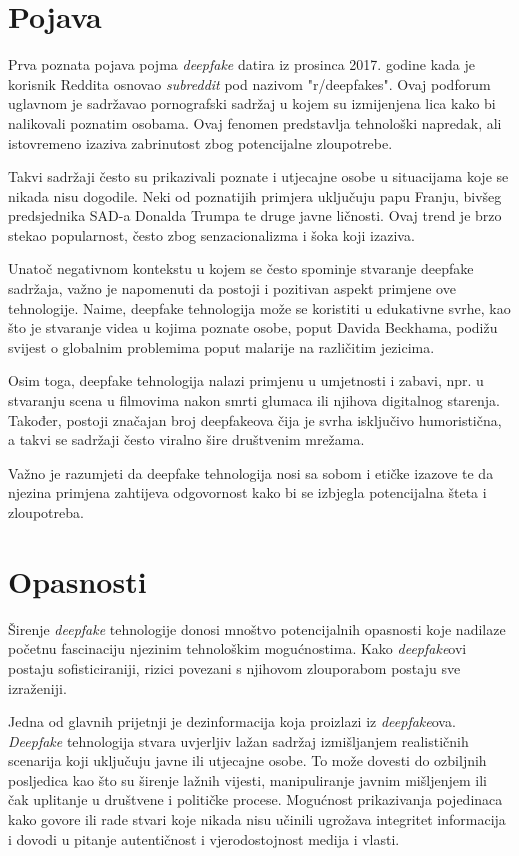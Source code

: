 \documentclass[seminarski, times, utf8]{fer}
\begin{document}
\section{Pojava}

Prva poznata pojava pojma \textit{deepfake} datira iz prosinca 2017. godine kada je korisnik Reddita osnovao \textit{subreddit} pod nazivom "r/deepfakes".\cite{britannica_deepfake}%
Ovaj podforum uglavnom je sadržavao pornografski sadržaj u kojem su izmijenjena lica kako bi nalikovali poznatim osobama. Ovaj fenomen predstavlja tehnološki napredak, ali istovremeno izaziva zabrinutost zbog potencijalne zloupotrebe.

Takvi sadržaji često su prikazivali poznate i utjecajne osobe u situacijama koje se nikada nisu dogodile. Neki od poznatijih primjera uključuju papu Franju, bivšeg predsjednika SAD-a Donalda Trumpa te druge javne ličnosti. Ovaj trend je brzo stekao popularnost, često zbog senzacionalizma i šoka koji izaziva.

Unatoč negativnom kontekstu u kojem se često spominje stvaranje deepfake sadržaja, važno je napomenuti da postoji i pozitivan aspekt primjene ove tehnologije. Naime, deepfake tehnologija može se koristiti u edukativne svrhe, kao što je stvaranje videa u kojima poznate osobe, poput Davida Beckhama, podižu svijest o globalnim problemima poput malarije na različitim jezicima.

Osim toga, deepfake tehnologija nalazi primjenu u umjetnosti i zabavi, npr. u stvaranju scena u filmovima nakon smrti glumaca ili njihova digitalnog starenja. Također, postoji značajan broj deepfakeova čija je svrha isključivo humoristična, a takvi se sadržaji često viralno šire društvenim mrežama.

Važno je razumjeti da deepfake tehnologija nosi sa sobom i etičke izazove te da njezina primjena zahtijeva odgovornost kako bi se izbjegla potencijalna šteta i zloupotreba.
\section{Opasnosti}

Širenje \textit{deepfake} tehnologije donosi mnoštvo potencijalnih opasnosti koje nadilaze početnu fascinaciju njezinim tehnološkim mogućnostima. Kako \textit{deepfake}ovi postaju sofisticiraniji, rizici povezani s njihovom zlouporabom postaju sve izraženiji. 

Jedna od glavnih prijetnji je dezinformacija koja proizlazi iz \textit{deepfake}ova. \textit{Deepfake} tehnologija stvara uvjerljiv lažan sadržaj izmišljanjem realističnih scenarija koji uključuju javne ili utjecajne osobe. To može dovesti do ozbiljnih posljedica kao što su širenje lažnih vijesti, manipuliranje javnim mišljenjem ili čak uplitanje u društvene i političke procese. Mogućnost prikazivanja pojedinaca kako govore ili rade stvari koje nikada nisu učinili ugrožava integritet informacija i dovodi u pitanje autentičnost i vjerodostojnost medija i vlasti.
\end{document}

